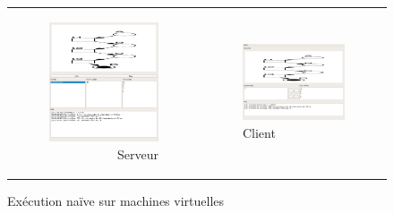 	\begin{figure}
		\centering
		\begin{tabular}{rl}
			\begin{subfigure}{0.5\textwidth}
				\centering
				\includegraphics[scale=0.45]{images/resultats/vm/serverVMsimple.png}
				\caption{Serveur}
			\end{subfigure}
			&
			\begin{subfigure}{0.5\textwidth}
				\centering
				\includegraphics[scale=0.45]{images/resultats/vm/clientVMsimple.png}
				\caption{Client}
			\end{subfigure}
		\end{tabular}
		
		\caption{Exécution naïve sur machines virtuelles}
		\label{fig.simpleVM}
	\end{figure}
	
